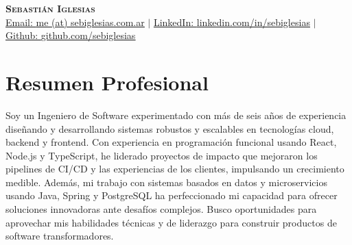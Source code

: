 \documentclass[letterpaper,11pt]{article}
\begin{document}

\begin{center}
    \textbf{\Huge \scshape Sebastián Iglesias} \\ \vspace{1pt}
    \href{https://sebiglesias.com.ar}{Email: \underline{me (at) sebiglesias.com.ar}} $|$ 
    \href{https://linkedin.com/in/sebiglesias}{LinkedIn: \underline{linkedin.com/in/sebiglesias}} $|$
    \href{https://github.com/sebiglesias}{Github: \underline{github.com/sebiglesias}}
\end{center}

\section{Resumen Profesional}
    Soy un Ingeniero de Software experimentado con más de seis años de experiencia diseñando y desarrollando sistemas robustos y escalables en tecnologías cloud, backend y frontend. Con experiencia en programación funcional usando React, Node.js y TypeScript, he liderado proyectos de impacto que mejoraron los pipelines de CI/CD y las experiencias de los clientes, impulsando un crecimiento medible. Además, mi trabajo con sistemas basados en datos y microservicios usando Java, Spring y PostgreSQL ha perfeccionado mi capacidad para ofrecer soluciones innovadoras ante desafíos complejos. Busco oportunidades para aprovechar mis habilidades técnicas y de liderazgo para construir productos de software transformadores.

\end{document}
